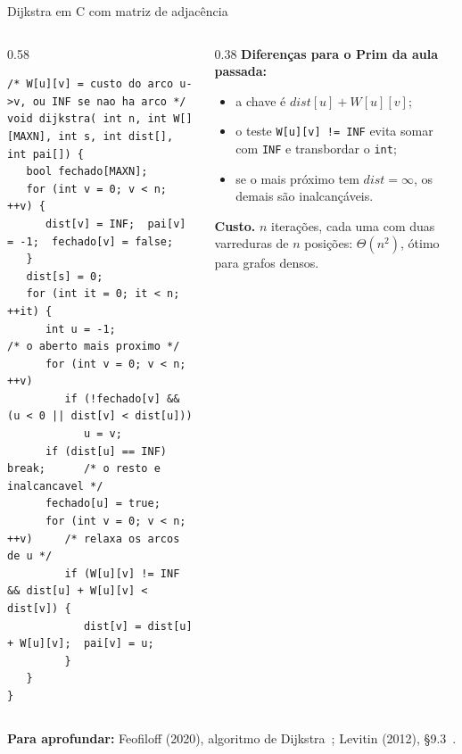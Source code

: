 \documentclass[aspectratio=169,xcolor=table]{beamer}
\newcommand{\fonte}[1]{%
  \vfill
  {\tiny\color{gray!55!black}\textbf{Para aprofundar:} #1\par}%
}
\begin{document}
\begin{frame}[fragile]{Dijkstra em C com matriz de adjacência}
  \begin{columns}[T]
    \begin{column}{0.58\textwidth}
\begin{lstlisting}[basicstyle=\ttfamily\tiny]
/* W[u][v] = custo do arco u->v, ou INF se nao ha arco */
void dijkstra( int n, int W[][MAXN], int s, int dist[], int pai[]) {
   bool fechado[MAXN];
   for (int v = 0; v < n; ++v) {
      dist[v] = INF;  pai[v] = -1;  fechado[v] = false;
   }
   dist[s] = 0;
   for (int it = 0; it < n; ++it) {
      int u = -1;                     /* o aberto mais proximo */
      for (int v = 0; v < n; ++v)
         if (!fechado[v] && (u < 0 || dist[v] < dist[u]))
            u = v;
      if (dist[u] == INF) break;      /* o resto e inalcancavel */
      fechado[u] = true;
      for (int v = 0; v < n; ++v)     /* relaxa os arcos de u */
         if (W[u][v] != INF && dist[u] + W[u][v] < dist[v]) {
            dist[v] = dist[u] + W[u][v];  pai[v] = u;
         }
   }
}
\end{lstlisting}
    \end{column}
    \begin{column}{0.38\textwidth}
      \scriptsize
      \textbf{Diferenças para o Prim da aula passada:}
      \begin{itemize}
        \scriptsize
        \item a chave é $\mathit{dist}[u] + W[u][v]$;
        \item o teste \texttt{W[u][v] != INF} evita somar com \texttt{INF} e transbordar o
              \texttt{int};
        \item se o mais próximo tem $\mathit{dist} = \infty$, os demais são inalcançáveis.
      \end{itemize}
      \medskip

      \textbf{Custo.} $n$ iterações, cada uma com duas varreduras de $n$ posições:
      $\Theta(n^2)$, ótimo para grafos densos.
    \end{column}
  \end{columns}
  \fonte{Feofiloff (2020), algoritmo de Dijkstra~\cite{feofiloff2020grafos};
    Levitin (2012), \S 9.3~\cite{levitin2012introduction}.}
\end{frame}
\end{document}
